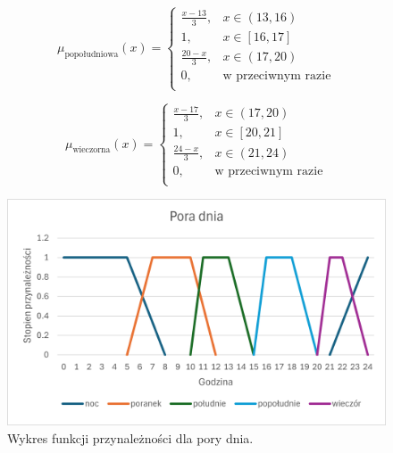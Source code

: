\documentclass{article}
\begin{document}
\begin{enumerate}
        \begin{equation}
            \mu_{\text{popołudniowa}}(x) =
            \begin{cases}
            \frac{x - 13}{3}, & x \in (13, 16) \\
            1, & x \in [16, 17] \\
            \frac{20 - x}{3}, & x \in (17, 20) \\
            0, & \text{w przeciwnym razie} \\
             \end{cases}
        \end{equation}

        \begin{equation}
            \mu_{\text{wieczorna}}(x) =
            \begin{cases}
            \frac{x - 17}{3}, & x \in (17, 20) \\
            1, & x \in [20, 21] \\
            \frac{24 - x}{3}, & x \in (21, 24) \\
            0, & \text{w przeciwnym razie} \\
            \end{cases}
        \end{equation} 
        
    \begin{figure}[H]
    \centering
    \includegraphics[width=\textwidth]{img/day.png}
    \caption{Wykres funkcji przynależności dla pory dnia.}
    \end{figure}
    

\end{enumerate}
\end{document}
